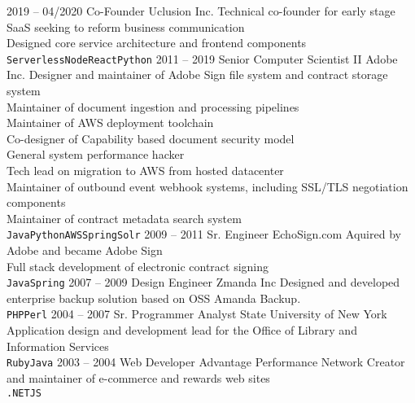 \documentclass[9pt]{developercv} %
\begin{document}
\begin{entrylist}
	\entry
		{2019 -- 04/2020}
		{Co-Founder}
		{Uclusion Inc.}
	        {Technical co-founder for early stage SaaS seeking to reform business communication\\
	        Designed core service architecture and frontend components\\
		\texttt{Serverless}\slashsep\texttt{Node}\slashsep\texttt{React}\slashsep\texttt{Python}}
	\entry
		{2011 -- 2019}
		{Senior Computer Scientist II}
		{Adobe Inc.}
                {Designer and maintainer of Adobe Sign file system and contract storage system\\
                Maintainer of document ingestion and processing pipelines\\
                Maintainer of AWS deployment toolchain\\
                Co-designer of Capability based document security model\\
                General system performance hacker\\
                Tech lead on migration to AWS from hosted datacenter\\
                Maintainer of outbound event webhook systems, including SSL/TLS negotiation components\\
                Maintainer of contract metadata search system\\
		\texttt{Java}\slashsep\texttt{Python}\slashsep\texttt{AWS}\slashsep\texttt{Spring}\slashsep\texttt{Solr}}
	\entry
		{2009 -- 2011}
		{Sr. Engineer}
		{EchoSign.com}
                {Aquired by Adobe and became Adobe Sign\\
                Full stack development of electronic contract signing \\
		\texttt{Java}\slashsep\texttt{Spring}}
	\entry
		{2007 -- 2009}
		{Design Engineer}
		{Zmanda Inc}
                {Designed and developed enterprise backup solution based on OSS Amanda Backup.\\
		\texttt{PHP}\slashsep\texttt{Perl}}
	\entry
		{2004 -- 2007}
		{Sr. Programmer Analyst}
		{State University of New York}
                {Application design and development lead for the Office of Library and Information Services\\
		\texttt{Ruby}\slashsep\texttt{Java}}
	\entry
		{2003 -- 2004}
		{Web Developer}
		{Advantage Performance Network}
                {Creator and maintainer of e-commerce and rewards web sites\\
		\texttt{.NET}\slashsep\texttt{JS}}
\end{entrylist}
\end{document}
